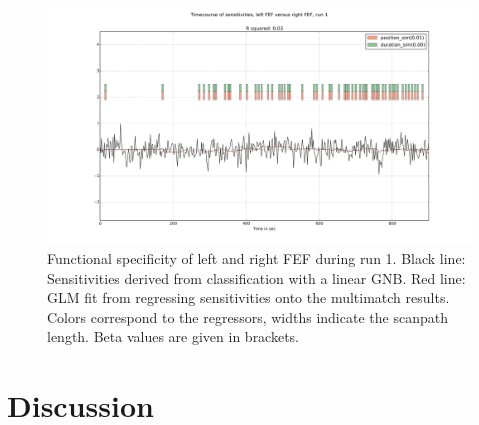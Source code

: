 \documentclass[a4paper, 12pt]{scrreprt}
\begin{document}
\begin{figure}[H]
	\includegraphics[scale=0.3]{img/tc_lFEF_rFEF.png}
	\caption[short text]{{\small Functional specificity of left and right FEF during run 1. Black line: Sensitivities derived from classification with a linear GNB. Red line: GLM fit from regressing sensitivities onto the multimatch results. Colors correspond to the regressors, widths indicate the scanpath length. Beta values are given in brackets.}}
	\label{fig:tc_FEF}	
\end{figure}


\section{Discussion}
\end{document}
